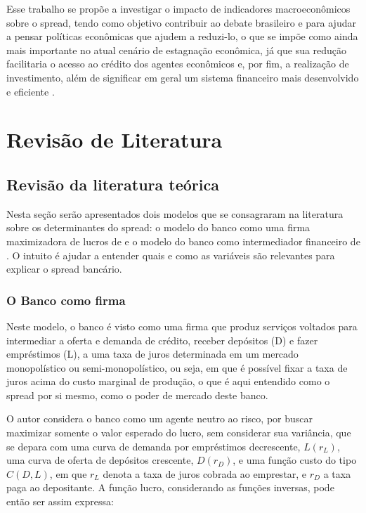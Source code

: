 \documentclass[a4paper,
               article,
               12pt,
               openany,
               oneside,
               english,
               brazil]{abntex2}
\numberwithin{equation}{section}
\begin{document}
    Esse trabalho se propõe a investigar o impacto de indicadores macroeconômicos sobre o spread, tendo como objetivo contribuir ao debate brasileiro e para ajudar a pensar políticas econômicas que ajudem a reduzi-lo, o que se impõe como ainda mais importante no atual cenário de estagnação econômica, já que sua redução facilitaria o acesso ao crédito dos agentes econômicos e, por fim, a realização de investimento, além de significar em geral um sistema financeiro mais desenvolvido e eficiente \cite[p.~8]{manhica12}.


\section{Revisão de Literatura}
\subsection{Revisão da literatura teórica}

    Nesta seção serão apresentados dois modelos que se consagraram na literatura sobre os determinantes do spread: o modelo do banco como uma firma maximizadora de lucros de \textcite{klein} e o modelo do banco como intermediador financeiro de \textcite{hoesaunders}. O intuito é ajudar a entender quais e como as variáveis são relevantes para explicar o spread bancário.

\subsubsection{O Banco como firma}

    Neste modelo, o banco é visto como uma firma que produz serviços voltados para intermediar a oferta e demanda de crédito, receber depósitos (D) e fazer empréstimos (L), a uma taxa de juros determinada em um mercado monopolístico ou semi-monopolístico, ou seja, em que é possível fixar a taxa de juros acima do custo marginal de produção, o que é aqui entendido como o spread por si mesmo, como o poder de mercado deste banco. \cite{oreiro}

    O autor considera o banco como um agente neutro ao risco, por buscar maximizar somente o valor esperado do lucro, sem considerar sua variância, que se depara com uma curva de demanda por empréstimos decrescente, $ L(r_L) $, uma curva de oferta de depósitos crescente, $ D(r_D) $, e uma função custo do tipo $ C(D, L) $, em que $ r_L $ denota a taxa de juros cobrada ao emprestar, e $ r_D $ a taxa paga ao depositante. A função lucro, considerando as funções inversas, pode então ser assim expressa: 
    
\end{document}

